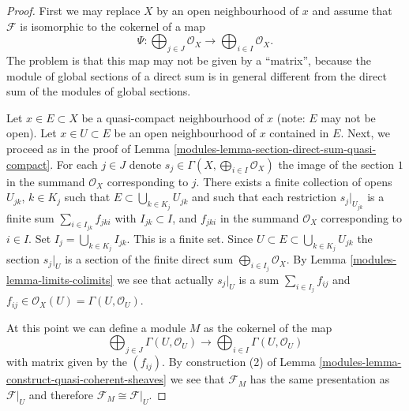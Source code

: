 \begin{proof}

First we may replace $X$ by an open neighbourhood of $x$
and assume that $\mathcal{F}$ is isomorphic to the
cokernel of a map
$$
\Psi :
\bigoplus\nolimits_{j \in J}
\mathcal{O}_X
\longrightarrow
\bigoplus\nolimits_{i \in I}
\mathcal{O}_X.
$$
The problem is that this map may not be given by
a ``matrix'', because the module of global sections of a direct sum
is in general different from the direct sum of the modules
of global sections.

\medskip\noindent
Let $x \in E \subset X$ be a quasi-compact
neighbourhood of $x$ (note: $E$ may not be open).
Let $x \in U \subset E$ be an open neighbourhood of
$x$ contained in $E$.
Next, we proceed as in the proof of
Lemma \ref{modules-lemma-section-direct-sum-quasi-compact}.
For each $j \in J$ denote
$s_j \in \Gamma(X, \bigoplus\nolimits_{i \in I} \mathcal{O}_X)$
the image of the section $1$ in the summand $\mathcal{O}_X$
corresponding to $j$. There exists a finite collection of opens
$U_{jk}$, $k \in K_j$ such that $E \subset \bigcup_{k \in K_j} U_{jk}$
and such that each restriction $s_j|_{U_{jk}}$
is a finite sum $\sum_{i \in I_{jk}} f_{jki}$
with $I_{jk} \subset I$, and $f_{jki}$ in the summand
$\mathcal{O}_X$ corresponding to $i \in I$. Set
$I_j = \bigcup_{k \in K_j} I_{jk}$. This is a finite set.
Since $U \subset E \subset \bigcup_{k \in K_j} U_{jk}$
the section $s_j|_U$ is a section of the finite direct sum
$\bigoplus_{i \in I_j} \mathcal{O}_X$.
By Lemma \ref{modules-lemma-limits-colimits}
we see that actually $s_j|_U$ is a sum
$\sum_{i \in I_j} f_{ij}$ and
$f_{ij} \in \mathcal{O}_X(U) = \Gamma(U, \mathcal{O}_U)$.

\medskip\noindent
At this point we can define a module $M$ as the cokernel of the map
$$
\bigoplus\nolimits_{j \in J}
\Gamma(U, \mathcal{O}_U)
\longrightarrow
\bigoplus\nolimits_{i \in I}
\Gamma(U, \mathcal{O}_U)
$$
with matrix given by the $(f_{ij})$. By construction (2) of
Lemma \ref{modules-lemma-construct-quasi-coherent-sheaves} we see that
$\mathcal{F}_M$ has the same presentation as $\mathcal{F}|_U$
and therefore $\mathcal{F}_M \cong \mathcal{F}|_U$.
\end{proof}


